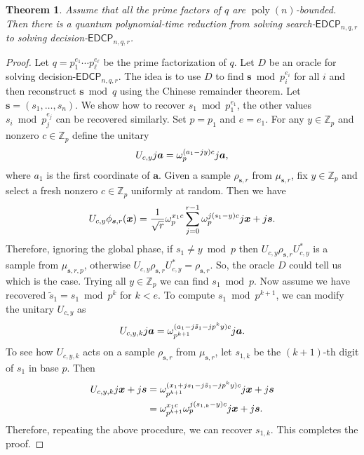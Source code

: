 \documentclass[11pt]{article}
\theoremstyle{plain}
\newtheorem{theorem}{Theorem}
\theoremstyle{definition}
\DeclareMathOperator{\poly}{poly}
\let\ket\relax
\DeclarePairedDelimiter{\ket}{\lvert}{\rangle}
\def\Z{\mathbb{Z}}
\def\edcp{\mathsf{EDCP}}
\begin{document}
\begin{theorem}
    Assume that all the prime factors of $q$ are $\poly(n)$-bounded. Then there is a quantum polynomial-time reduction from solving search-$\edcp_{n, q, r}$ to solving decision-$\edcp_{n, q, r}$.
\end{theorem}
\begin{proof}
    Let $q = p_1^{e_1} \cdots p_\ell^{e_\ell}$ be the prime factorization of $q$. Let $D$ be an oracle for solving decision-$\edcp_{n, q, r}$. The idea is to use $D$ to find $\bm{s} \bmod p_i^{e_i}$ for all $i$ and then reconstruct $\bm{s} \bmod q$ using the Chinese remainder theorem. Let $\bm{s} = (s_1, \dots, s_n)$. We show how to recover $s_1 \bmod p_1^{e_1}$, the other values $s_i \bmod p_j^{e_j}$ can be recovered similarly. Set $p = p_1$ and $e = e_1$.
    For any $y \in \Z_p$ and nonzero $c \in \Z_p$ define the unitary  
    \[ U_{c, y} \ket{j}\ket{\bm{a}} = \omega_p^{(a_1 - jy)c}\ket{j}\ket{\bm{a}}, \]
    where $a_1$ is the first coordinate of $\bm{a}$. Given a sample $\rho_{\bm{s}, r}$ from $\mu_{\bm{s}, r}$, fix $y \in \Z_p$ and select a fresh nonzero $c \in \Z_p$ uniformly at random. Then we have
    \[ U_{c, y}\ket{\phi_{\bm{s}, r}(\bm{x})} = \frac{1}{\sqrt{r}} \omega_p^{x_1c}\sum_{j = 0}^{r - 1} \omega_p^{j(s_1 - y)c} \ket{j}\ket{\bm{x} + j\bm{s}}. \]
    Therefore, ignoring the global phase, if $s_1 \ne y \bmod p$ then $U_{c, y} \rho_{\bm{s}, r} U_{c, y}^*$ is a sample from $\mu_{\bm{s}, r, p}$, otherwise $U_{c, y} \rho_{\bm{s}, r} U_{c, y}^* = \rho_{\bm{s}, r}$. So, the oracle $D$ could tell us which is the case. Trying all $y \in \Z_p$ we can find $s_1 \bmod p$. Now assume we have recovered $\tilde{s}_1 = s_1 \bmod p^k$ for $k < e$. To compute $s_1 \bmod p^{k + 1}$, we can modify the unitary $U_{c, y}$ as 
    \[ U_{c, y, k} \ket{j}\ket{\bm{a}} = \omega_{p^{k + 1}}^{(a_1 - j\tilde{s}_1 - jp^ky)c}\ket{j}\ket{\bm{a}}. \]
    To see how $U_{c, y, k}$ acts on a sample $\rho_{\bm{s}, r}$ from $\mu_{\bm{s}, r}$, let $s_{1, k}$ be the $(k + 1)$-th digit of $s_1$ in base $p$. Then
    \begin{align*}
        U_{c, y, k} \ket{j}\ket{\bm{x} + j\bm{s}}
        & = \omega_{p^{k + 1}}^{(x_1 + js_1 - j\tilde{s}_1 - jp^ky)c}\ket{j}\ket{\bm{x} + j\bm{s}} \\
        & = \omega_{p^{k + 1}}^{x_1c} \omega_p^{j(s_{1, k} - y)c}\ket{j}\ket{\bm{x} + j\bm{s}}.
    \end{align*}
    Therefore, repeating the above procedure, we can recover $s_{1, k}$. This completes the proof.
\end{proof}
\end{document}
